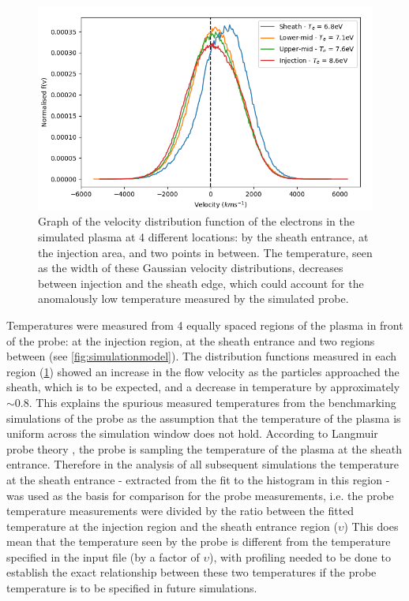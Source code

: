 \documentclass[a4paper, 11pt]{article} %
\begin{document}
	\begin{figure}
		
		\vspace{-15pt}
		\centering
		\includegraphics[width=1.0\linewidth]{AllDataFigures/SpiceSimulations/Tests/distributionChange.png}
		
		\caption{\label{fig:distChange}Graph of the velocity distribution function of the electrons in the simulated plasma at 4 different locations: by the sheath entrance, at the injection area, and two points in between. The temperature, seen as the width of these Gaussian velocity distributions, decreases between injection and the sheath edge, which could account for the anomalously low temperature measured by the simulated probe.}
		\vspace{-10pt}
	\end{figure}
	Temperatures were measured from 4 equally spaced regions of the plasma in front of the probe: at the injection region, at the sheath entrance and two regions between (see \cref{fig:simulationmodel}).
	The distribution functions measured in each region (\cref{fig:distChange}) showed an increase in the flow velocity as the particles approached the sheath, which is to be expected, and a decrease in temperature by approximately $\sim 0.8$. 
	This explains the spurious measured temperatures from the benchmarking simulations of the probe as the assumption that the temperature of the plasma is uniform across the simulation window does not hold. 
	According to Langmuir probe theory \cite{Hutchinson2002}, the probe is sampling the temperature of the plasma at the sheath entrance. 
	Therefore in the analysis of all subsequent simulations the temperature at the sheath entrance - extracted from the fit to the histogram in this region - was used as the basis for comparison for the probe measurements, i.e. the probe temperature measurements were divided by the ratio between the fitted temperature at the injection region and the sheath entrance region ($\upsilon$)
	This does mean that the temperature seen by the probe is different from the temperature specified in the input file (by a factor of $\upsilon$), with profiling needed to be done to establish the exact relationship between these two temperatures if the probe temperature is to be specified in future simulations.
\end{document}
